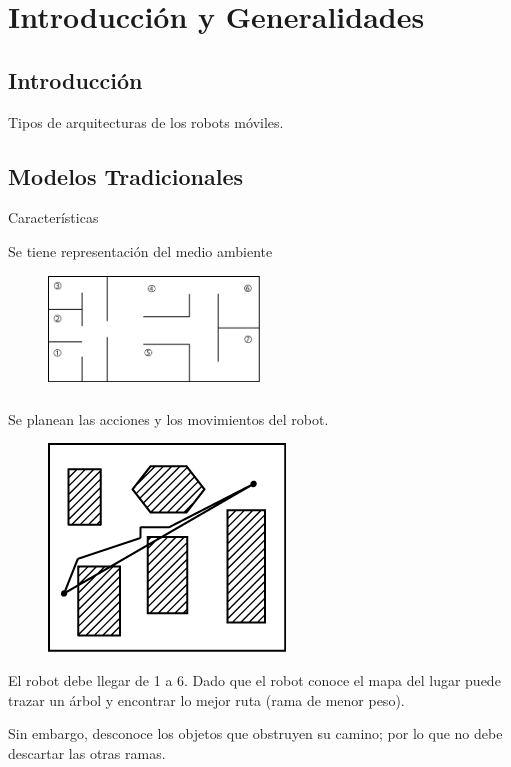 \chapter{Introducción y Generalidades}

\section{Introducción}
Tipos de arquitecturas de los robots móviles.

\section{Modelos Tradicionales}
Características

Se tiene representación del medio ambiente

\begin{figure}[h!]
	\centering
	\includegraphics[width=0.5\textwidth]{images/img1.png}
	\label{figura1}
\end{figure}

\paragraph{}
Se planean las acciones y los movimientos del robot.

\begin{figure}
  \begin{center}
    \includegraphics[width = 2 cm]{images/img2.png}
  \end{center}
    
\end{figure}

El robot debe llegar de 1 a 6. Dado que el robot conoce el mapa del lugar puede trazar un árbol y encontrar lo mejor ruta (rama de menor peso).

Sin embargo, desconoce los objetos que obstruyen su camino; por lo que no debe descartar las otras ramas.

